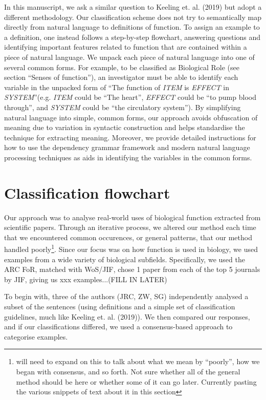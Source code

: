 \documentclass{article}
\begin{document}
In this manuscript, we ask a similar question to Keeling et. al. (2019) but adopt a different methodology.
Our classification scheme does not try to semantically map directly from natural language to definitions of function.
To assign an example to a definition, one instead follows a step-by-step flowchart, answering questions and identifying important features related to function that are contained within a piece of natural language.
We unpack each piece of natural language into one of several common forms.
For example, to be classified as Biological Role (see section ``Senses of function''), an investigator must be able to identify each variable in the unpacked form of ``The function of \emph{ITEM} is \emph{EFFECT} in \emph{SYSTEM}''(e.g. \emph{ITEM} could be ``The heart'', \emph{EFFECT} could be ``to pump blood through'', and \emph{SYSTEM} could be ``the circulatory system'').
By simplifying natural language into simple, common forms, our approach avoids obfuscation of meaning due to variation in syntactic construction and helps standardise the technique for extracting meaning.
Moreover, we provide detailed instructions for how to use the dependency grammar framework and modern natural language processing techniques as aids in identifying the variables in the common forms.

\section{Classification flowchart}
\label{sec:class-scheme}

Our approach was to analyse real-world uses of biological function extracted from scientific papers.
Through an iterative process, we altered our method each time that we encountered common occurences, or general patterns, that our method handled poorly\footnote{will need to expand on this to talk about what we mean by ``poorly'', how we began with consensus, and so forth. Not sure whether all of the general method should be here or whether some of it can go later. Currently pasting the various snippets of text about it in this section}.
Since our focus was on how function is used in biology, we used examples from a wide variety of biological subfields.
Specifically, we used the ARC FoR, matched with WoS/JIF, chose 1 paper from each of the top 5 journals by JIF, giving us xxx examples...(FILL IN LATER)

To begin with, three of the authors (JRC, ZW, SG) independently analysed a subset of the sentences (using definitions and a simple set of classification guidelines, much like Keeling et. al. (2019)).
We then compared our responses, and if our classifications differed, we used a consensus-based approach to categorise examples.
\end{document}
